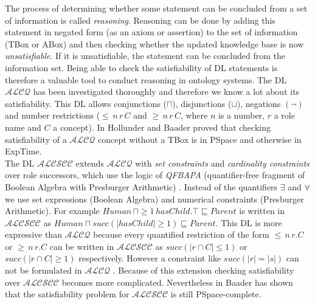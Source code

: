 \documentclass{book}
\theoremstyle{break}
\theoremstyle{definition}
\begin{document}
The process of determining whether some statement can be concluded from a set of information is called \textit{reasoning}. Reasoning can be done by adding this statement in negated form (as an axiom or assertion) to the set of information (TBox or ABox) and then checking whether the updated knowledge base is now \textit{unsatisfiable}. If it is unsatisfiable, the statement can be concluded from the information set. Being able to check the satisfiability of DL statements is therefore a valuable tool to conduct reasoning in ontology systems. The DL $\mathcal{ALCQ}$ \cite{1,6} has been investigated thoroughly and therefore we know a lot about its satisfiability. This DL allows conjunctions ($\sqcap$), disjunctions ($\sqcup$), negations $(\neg)$ and number restrictions ($\leq\,n\,r\, C$ and $\geq \, n\, r\, C$, where $n$ is a number, $r$ a role name and $C$ a concept). In \cite{1} Hollunder and Baader proved that checking satisfiability of a $\mathcal{ALCQ}$ concept without a TBox is in PSpace and otherwise in ExpTime.\\
The DL $\mathcal{ALCSCC}$ \cite{4} extends $\mathcal{ALCQ}$ with \textit{set constraints} and \textit{cardinality constraints} over role successors, which use the logic of \textit{QFBAPA} (quantifier-free fragment of Boolean Algebra with Presburger Arithmetic) \cite{KuncakRinard}. Instead of the quantifiers $\exists$ and $\forall$ we use set expressions (Boolean Algebra) and numerical constraints (Presburger Arithmetic). For example $Human\,\sqcap \geq 1\,hasChild.\top\sqsubseteq Parent$ is written in $\mathcal{ALCSCC}$ as $Human\sqcap succ(|hasChild|\geq 1)\sqsubseteq Parent$. This DL is more expressive than $\mathcal{ALCQ}$ because every quantified restriction of the form $\leq\,n\,r.C$ or $\geq \, n\, r.C$ can be written in $\mathcal{ALCSCC}$ as $succ(|r\cap C|\leq 1)$ or $succ(|r\cap C|\geq 1)$ respectively. However a constraint like $succ(|r|=|s|)$ can not be formulated in $\mathcal{ALCQ}$ \cite{4}. Because of this extension checking satisfiability over $\mathcal{ALCSCC}$ becomes more complicated. Nevertheless in \cite{4} Baader has shown that the satisfiability problem for $\mathcal{ALCSCC}$ is still PSpace-complete.\\
\end{document}
